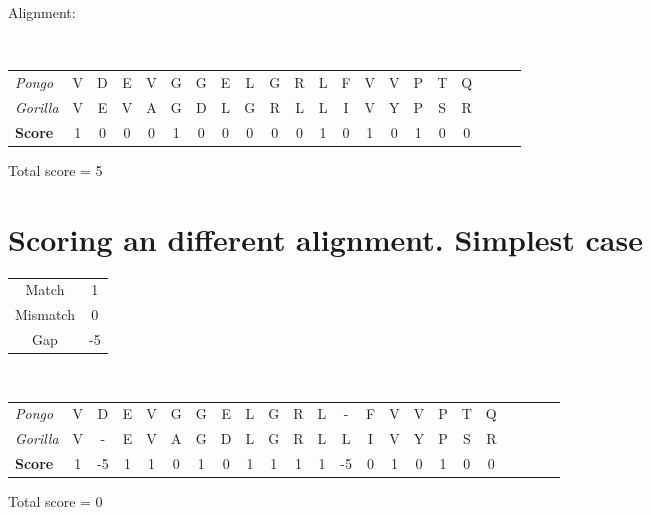 \documentclass[landscape]{foils}
\begin{document}
Alignment:\\
{\tt
\small
\begin{tabular}{lcccccccccccccccccccc}
{\em Pongo}   &V&D&E&V&G&G&E&L&G&R&L&F&V&V&P&T&Q\\ 
{\em Gorilla} &V&E&V&A&G&D&L&G&R&L&L&I&V&Y&P&S&R\\
\hline
{\bf Score}   &1&0&0&0&1&0&0&0&0&0&1&0&1&0&1&0&0\\
\end{tabular}
}

Total score = 5


\myNewSlide
\section*{Scoring an different alignment. Simplest case}
\begin{center}
\begin{tabular}{cc}
Match & 1 \\
Mismatch & 0 \\
Gap & -5 \\
\end{tabular}
\end{center}
{\tt
\small
\begin{tabular}{lcccccccccccccccccccccc}
{\em Pongo}   &V&D &E&V&G&G&E&L&G&R&L&- &F&V&V&P&T&Q\\ 
{\em Gorilla} &V&- &E&V&A&G&D&L&G&R&L&L &I&V&Y&P&S&R\\
\hline
{\bf Score}   &1&-5&1&1&0&1&0&1&1&1&1&-5&0&1&0&1&0&0\\
\end{tabular}
}

Total score = 0

\myNewSlide
\end{document}
